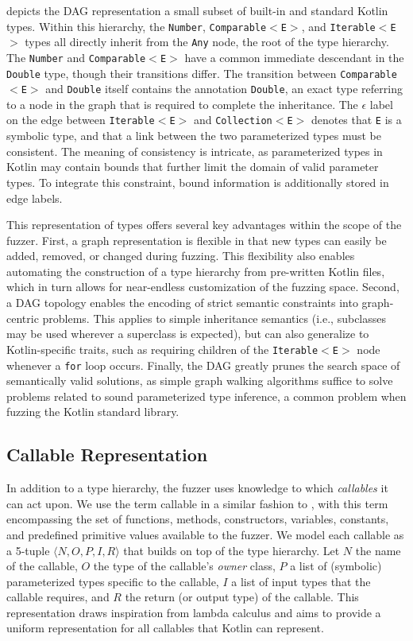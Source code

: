  depicts the \Gls{DAG} representation
a small subset of built-in and standard Kotlin types.
Within this hierarchy, the \texttt{Number}, \texttt{Comparable$<$E$>$}, 
and \texttt{Iterable$<$E$>$} types all directly inherit from the \texttt{Any} node, 
the root of the type hierarchy.
The \texttt{Number} and \texttt{Comparable$<$E$>$} have a common immediate descendant in the 
\texttt{Double} type, though their transitions differ.
The transition between \texttt{Comparable$<$E$>$} and \texttt{Double} itself
contains the annotation \texttt{Double}, an exact type referring to a node in the graph
that is required to complete the inheritance.
The $\epsilon$ label on the edge between \texttt{Iterable$<$E$>$} and \texttt{Collection$<$E$>$}
denotes that \texttt{E} is a symbolic type, and that a link between the two parameterized types
must be consistent.
The meaning of consistency is intricate,
as parameterized types in Kotlin may contain bounds
that further limit the domain of valid parameter types.
To integrate this constraint, bound information is additionally
stored in edge labels.

This representation of types offers several key advantages within the scope of the fuzzer.
First, a graph representation is flexible in that new types can easily be added, removed, or changed
during fuzzing.
This flexibility also enables automating the construction of a type hierarchy
from pre-written Kotlin files, which in turn allows for near-endless customization of the fuzzing space.
Second, a \Gls{DAG} topology enables the encoding of strict semantic constraints into
graph-centric problems.
This applies to simple inheritance semantics
(i.e., subclasses may be used wherever a superclass is expected),
but can also generalize to Kotlin-specific traits,
such as requiring children of the \texttt{Iterable$<$E$>$}
node whenever a \texttt{for} loop occurs.
Finally, the \Gls{DAG} greatly prunes the search space of semantically valid solutions, as simple graph walking
algorithms suffice to solve problems related to sound parameterized type inference, a common problem
when fuzzing the Kotlin standard library.

\subsection{\label{subsec:callables}Callable Representation}
In addition to a type hierarchy, the fuzzer uses knowledge to which \textit{callables}
it can act upon.
We use the term callable in a similar fashion to \citet{stepanov2021type}, with this term encompassing
the set of functions, methods, constructors, variables, constants, and predefined primitive values
available to the fuzzer.
We model each callable as a 5-tuple $\langle N, O, P, I, R \rangle$ that builds on top of the
type hierarchy.
Let $N$ the name of the callable, $O$ the type of the callable's \textit{owner} class,
$P$ a list of (symbolic) parameterized types specific to the callable,
$I$ a list of input types that the callable requires,
and $R$ the return (or output type) of the callable.
This representation draws inspiration from lambda calculus and aims to provide a uniform representation
for all callables that Kotlin can represent.


